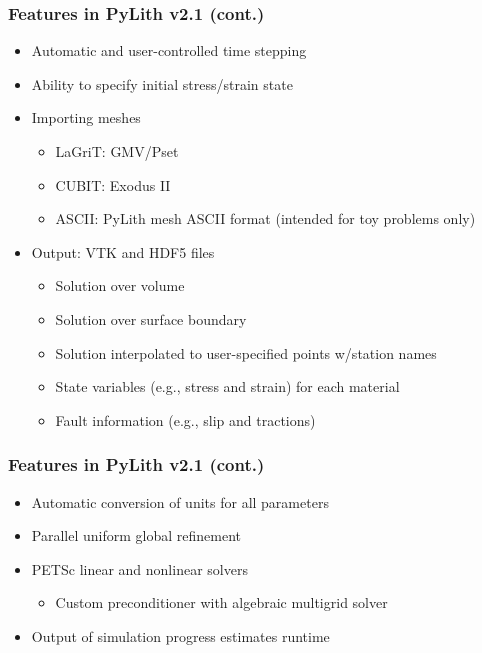\documentclass{beamer}
\begin{document}
\begin{frame}
  \frametitle{Features in PyLith v2.1 (cont.)}
  \summary{}

  \begin{itemize}
  \item Automatic and user-controlled time stepping
  \item Ability to specify initial stress/strain state
  \item Importing meshes
    \begin{itemize}
    \item LaGriT: GMV/Pset
    \item CUBIT: Exodus II
    \item ASCII: PyLith mesh ASCII format (intended for toy problems only)
    \end{itemize}
  \item Output: VTK and HDF5 files
    \begin{itemize}
    \item Solution over volume
    \item Solution over surface boundary
    \item Solution interpolated to user-specified points w/station names
    \item State variables (e.g., stress and strain) for each material
    \item Fault information (e.g., slip and tractions)
    \end{itemize}
 \end{itemize}
  
\end{frame}


\begin{frame}
  \frametitle{Features in PyLith v2.1 (cont.)}
  \summary{}

  \begin{itemize}
  \item Automatic conversion of units for all parameters
  \item Parallel uniform global refinement
  \item PETSc linear and nonlinear solvers
    \begin{itemize}
    \item Custom preconditioner with algebraic multigrid solver
    \end{itemize}
  \item Output of simulation progress estimates runtime
 \end{itemize}
  
\end{frame}
\end{document}
